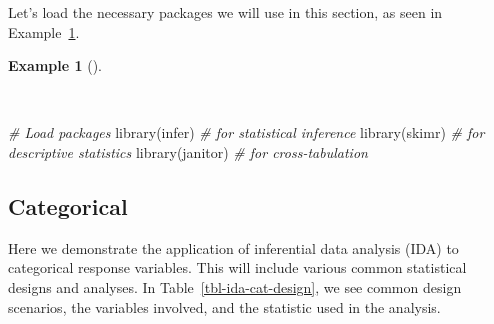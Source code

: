 \documentclass[
  letterpaper,
]{latex/krantz}
\newenvironment{Shaded}{\begin{snugshade}}{\end{snugshade}}
\newcommand{\CommentTok}[1]{\textcolor[rgb]{0.00,0.00,0.00}{\textit{#1}}}
\newcommand{\FunctionTok}[1]{\textcolor[rgb]{0.00,0.00,0.00}{#1}}
\newcommand{\NormalTok}[1]{\textcolor[rgb]{0.00,0.00,0.00}{#1}}
\theoremstyle{definition}
\newtheorem{example}{Example}[chapter]
\theoremstyle{remark}
\begin{document}
Let's load the necessary packages we will use in this section, as seen
in Example~\ref{exm-ida-setup}.

\begin{example}[]\protect\hypertarget{exm-ida-setup}{}\label{exm-ida-setup}

~

\begin{Shaded}
\begin{Highlighting}[]
\CommentTok{\# Load packages}
\FunctionTok{library}\NormalTok{(infer)      }\CommentTok{\# for statistical inference}
\FunctionTok{library}\NormalTok{(skimr)      }\CommentTok{\# for descriptive statistics}
\FunctionTok{library}\NormalTok{(janitor)    }\CommentTok{\# for cross{-}tabulation}
\end{Highlighting}
\end{Shaded}

\end{example}

\subsection{Categorical}\label{sec-ida-categorical}

Here we demonstrate the application of inferential data analysis (IDA)
to categorical response variables. This will include various common
statistical designs and analyses. In Table~\ref{tbl-ida-cat-design}, we
see common design scenarios, the variables involved, and the statistic
used in the analysis.
\end{document}
